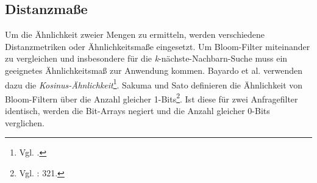 \subsection{Distanzmaße}\label{sec:distanzmasse}
Um die Ähnlichkeit zweier Mengen zu ermitteln, werden verschiedene Distanzmetriken oder Ähnlichkeitsmaße eingesetzt. Um Bloom-Filter miteinander zu vergleichen und insbesondere für die \textit{k}-nächste-Nachbarn-Suche muss ein geeignetes Ähnlichkeitsmaß zur Anwendung kommen. Bayardo et al. verwenden dazu die \textit{Kosinus-Ähnlichkeit}\footnote{Vgl. \cite{Bayardo2007}.}. Sakuma und Sato definieren die Ähnlichkeit von Bloom-Filtern über die Anzahl gleicher 1-Bits\footnote{Vgl. \cite{Sakuma2011}: 321.}. Ist diese für zwei Anfragefilter identisch, werden die Bit-Arrays negiert und die Anzahl gleicher 0-Bits verglichen. 

